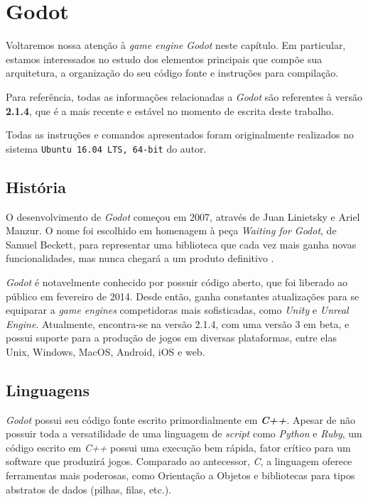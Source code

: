 \chapter{Godot}
\label{cap:godot}

Voltaremos nossa atenção à \textit{game engine} \textit{Godot} neste capítulo. Em particular, estamos interessados no estudo dos elementos principais que compõe sua arquitetura, a organização do seu código fonte e instruções para compilação.

Para referência, todas as informações relacionadas a \textit{Godot} são referentes à versão \textbf{2.1.4}, que é a mais recente e estável no momento de escrita deste trabalho.

Todas as instruções e comandos apresentados foram originalmente realizados no sistema \texttt{Ubuntu 16.04 LTS, 64-bit} do autor.


\section{História}

O desenvolvimento de \textit{Godot} começou em 2007, através de Juan Linietsky e Ariel Manzur. O nome foi escolhido em homenagem à peça \emph{Waiting for Godot}, de Samuel Beckett, para representar uma biblioteca que cada vez mais ganha novas funcionalidades, mas nunca chegará a um produto definitivo \citep{godotHistory}.

\textit{Godot} é notavelmente conhecido por possuir código aberto, que foi liberado ao público em fevereiro de 2014. Desde então, ganha constantes atualizações para se equiparar a \textit{game engines} competidoras mais sofisticadas, como \textit{Unity} e \textit{Unreal Engine}. Atualmente, encontra-se na versão 2.1.4, com uma versão 3 em beta, e possui suporte para a produção de jogos em diversas plataformas, entre elas Unix, Windows, MacOS, Android, iOS e web.


\section{Linguagens}
\label{godotLanguages}

\textit{Godot} possui seu código fonte escrito primordialmente em \textbf{\textit{C++}}. Apesar de não possuir toda a versatilidade de uma linguagem de \textit{script} como \textit{Python} e \textit{Ruby}, um código escrito em \textit{C++} possui uma execução bem rápida, fator crítico para um software que produzirá jogos. Comparado ao antecessor, \textit{C}, a linguagem oferece ferramentas mais poderosas, como Orientação a Objetos e bibliotecas para tipos abstratos de dados (pilhas, filas, etc.).


